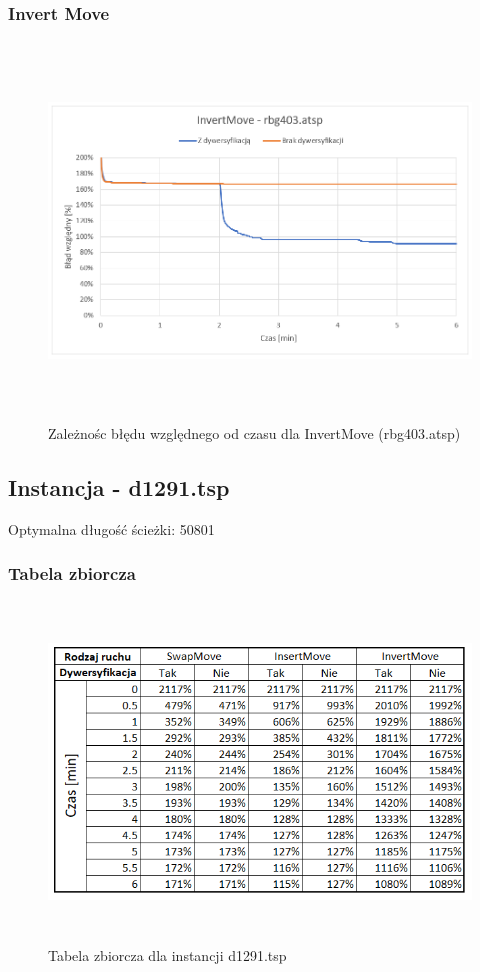 \documentclass[a4paper,11pt]{article}
\begin{document}
\subsubsection{Invert Move}
\begin{figure}[H]
\centering
\includegraphics[height=10cm]{InvertMove403.PNG}
\caption{Zależnośc błędu względnego od czasu dla InvertMove (rbg403.atsp)}
\end{figure}

\subsection{Instancja - d1291.tsp}

Optymalna długość ścieżki: 50801

\subsubsection{Tabela zbiorcza}

\begin{figure}[H]
\centering
\includegraphics[height=9cm]{1291.PNG}
\caption{Tabela zbiorcza dla instancji d1291.tsp}
\end{figure}
\end{document}
